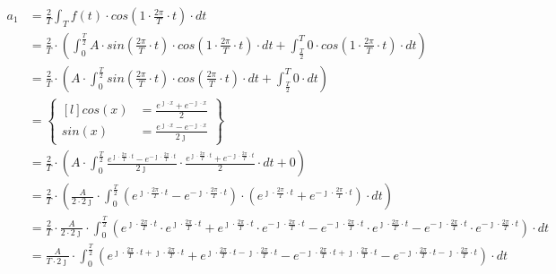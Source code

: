 \begin{align*}
a_1&=\frac{2}{T}\int_{T}f(t) \cdot cos\left( 1 \cdot \frac{2\pi}{T} \cdot t\right) \cdot dt\\
&=\frac{2}{T}\cdot\left(\int_{0}^{\frac{T}{2}}A \cdot sin\left( \frac{2\pi}{T} \cdot t\right) \cdot cos\left( 1 \cdot \frac{2\pi}{T} \cdot t\right) \cdot dt+\int_{\frac{T}{2}}^{T} 0 \cdot cos\left( 1 \cdot \frac{2\pi}{T} \cdot t\right) \cdot dt\right)\\
&=\frac{2}{T}\cdot\left(A \cdot \int_{0}^{\frac{T}{2}}sin\left( \frac{2\pi}{T} \cdot t\right) \cdot cos\left( \frac{2\pi}{T} \cdot t\right) \cdot dt+\int_{\frac{T}{2}}^{T} 0 \cdot dt\right)\\
&=\begin{Bmatrix*}[l]
cos\left(x\right)&=\frac{e^{\jmath \cdot x}+e^{-\jmath \cdot x}}{2}\\
sin\left(x\right)&=\frac{e^{\jmath \cdot x}-e^{-\jmath \cdot x}}{2 \jmath }
\end{Bmatrix*}\\
&=\frac{2}{T}\cdot\left(A \cdot \int_{0}^{\frac{T}{2}} \frac{e^{\jmath \cdot \frac{2\pi}{T} \cdot t}-e^{-\jmath \cdot \frac{2\pi}{T} \cdot t}}{2\jmath} \cdot \frac{e^{\jmath \cdot \frac{2\pi}{T} \cdot t}+e^{-\jmath \cdot \frac{2\pi}{T} \cdot t}}{2} \cdot dt+0\right)\\
&=\frac{2}{T}\cdot\left(\frac{A}{2\cdot 2\jmath} \cdot \int_{0}^{\frac{T}{2}} \left(e^{\jmath \cdot \frac{2\pi}{T} \cdot t}-e^{-\jmath \cdot \frac{2\pi}{T} \cdot t}\right)\cdot \left(e^{\jmath \cdot \frac{2\pi}{T} \cdot t}+e^{-\jmath \cdot \frac{2\pi}{T} \cdot t}\right) \cdot dt\right)\\
&=\frac{2}{T} \cdot \frac{A}{2\cdot 2\jmath} \cdot \int_{0}^{\frac{T}{2}}
\left(e^{\jmath \cdot \frac{2\pi}{T} \cdot t} \cdot e^{\jmath \cdot \frac{2\pi}{T} \cdot t} + e^{\jmath \cdot \frac{2\pi}{T} \cdot t} \cdot e^{-\jmath \cdot \frac{2\pi}{T} \cdot t} - e^{-\jmath \cdot \frac{2\pi}{T} \cdot t} \cdot e^{\jmath \cdot \frac{2\pi}{T} \cdot t} - e^{-\jmath \cdot \frac{2\pi}{T} \cdot t} \cdot e^{-\jmath \cdot \frac{2\pi}{T} \cdot t} \right) \cdot dt\\
&=\frac{A}{T\cdot 2\jmath} \cdot \int_{0}^{\frac{T}{2}}
\left(e^{\jmath \cdot \frac{2\pi}{T} \cdot t + \jmath \cdot \frac{2\pi}{T} \cdot t} + e^{\jmath \cdot \frac{2\pi}{T} \cdot t -\jmath \cdot \frac{2\pi}{T} \cdot t} - e^{-\jmath \cdot \frac{2\pi}{T} \cdot t+ \jmath \cdot \frac{2\pi}{T} \cdot t} - e^{-\jmath \cdot \frac{2\pi}{T} \cdot t -\jmath \cdot \frac{2\pi}{T} \cdot t} \right) \cdot dt\\

\end{align*}
